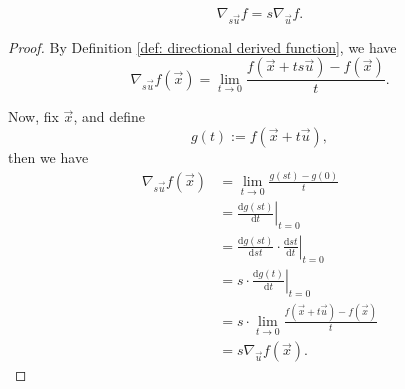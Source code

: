 \begin{proposition}
	$$
	\nabla_{s \vec u} f = s \nabla_{\vec u} f.
	$$
	
	\begin{proof}
		By Definition \ref{def: directional derived function}, we have
		$$
		\nabla_{s\vec u} f(\vec x) = \lim_{t \to 0} \frac{f(\vec x + t s \vec u) - f(\vec x)}{t}.
		$$
		
		Now, fix $\vec x$, and define
		$$
		g(t) := f(\vec x + t \vec u),
		$$
		then we have
		$$
		\begin{aligned}
			\nabla_{s \vec u} f(\vec x) &= \lim_{t \to 0} \frac{g(s t) - g(0)}{t} \\
			&= \left. \frac{\mathrm d g(st)}{\mathrm d t} \right|_{t = 0} \\
			&= \left. \frac{\mathrm d g(st)}{\mathrm d st} \cdot \frac{\mathrm dst}{\mathrm d t} \right|_{t = 0} \\
			&= s \cdot \left. \frac{\mathrm d g(t)}{\mathrm d t} \right|_{t = 0} \\
			&= s \cdot \lim_{t \to 0} \frac{f(\vec x + t \vec u) - f(\vec x)}{t} \\
			&= s \nabla_{\vec u} f(\vec x).
		\end{aligned}
		$$
	\end{proof}
\end{proposition}











































